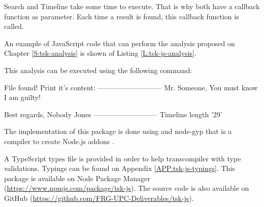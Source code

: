 Search and Timeline take some time to execute. That is why both have a callback
function as parameter. Each time a result is found, this callback function is
called.

An example of JavaScript code that can perform the analysis proposed on 
Chapter \ref{S:tsk-analysis} is shown of Listing \ref{L:tsk-js-analysis}.

\begin{codefigure}
\end{codefigure}

This analysis can be executed using the following command:

\begin{terminal}[caption=Execute The Sleuth Kit JavaScript analysis
,label=L:tsk-js-execute-analysis]
%
%
File found!
Print it's content:
---------------------------
Mr. Someone,
You must know I am guilty!

Best regards,
Nobody Jones
---------------------------
Timeline length '29'

\end{terminal}

The implementation of this package is done using \CC and node-gyp that is a 
compiler to create Node.js addons \cite{node-gyp-github}.


A TypeScript types file is provided in order to help transcompiler with type 
validations. Typings can be found on Appendix \ref{APP:tsk-js-typings}.
This package is available on Node Package Manager
(\url{https://www.npmjs.com/package/tsk-js}). The source code is also available
on GitHub (\url{https://github.com/FRG-UPC-Deliverables/tsk-js}).

